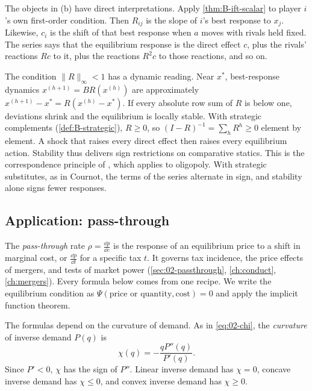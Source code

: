 The objects in (b) have direct interpretations. Apply \cref{thm:B-ift-scalar} to player $i$'s own first-order
condition. Then $R_{ij}$ is the slope of $i$'s best response to $x_j$. Likewise, $c_i$ is the shift of that best
response when $a$ moves with rivals held fixed. The series says that the equilibrium response is the direct effect $c$, plus the
rivals' reactions $Rc$ to it, plus the reactions $R^2c$ to those reactions, and so on.

\begin{remark}\label{rem:B-correspondence}
The condition $\|R\|_\infty < 1$ has a dynamic reading. Near $x^*$, best-response dynamics
$x^{(h + 1)} = BR(x^{(h)})$ are approximately $x^{(h + 1)} - x^* = R(x^{(h)} - x^*)$. If every absolute row sum of $R$ is
below one, deviations shrink and the equilibrium is locally stable. With strategic complements
(\cref{def:B-strategic}), $R \geq 0$, so
$(I - R)^{-1} = \sum_h R^h \geq 0$ element by element. A shock that raises every direct effect then raises every
equilibrium action. Stability thus delivers sign restrictions on comparative statics. This is the correspondence
principle of \citet{Samuelson1947}, which \citet{Dixit1986} applies to oligopoly. With strategic substitutes, as in
Cournot, the terms of the series alternate in sign, and stability alone signs fewer responses.
\end{remark}

\subsection{Application: pass-through}\label{sec:B-passthrough}

The \emph{pass-through} rate $\rho = \frac{\dd p}{\dd c}$ is the response of an equilibrium price to a shift in
marginal cost, or $\frac{\dd p}{\dd t}$ for a specific tax $t$. It governs tax incidence, the price effects of
mergers, and tests of market power (\cref{sec:02-passthrough}, \cref{ch:conduct}, \cref{ch:mergers}). Every formula
below comes from one recipe. We write the equilibrium condition as $\Psi(\text{price or quantity}, \text{cost}) = 0$
and apply the implicit function theorem.

The formulas depend on the curvature of demand. As in \eqref{eq:02-chi}, the \emph{curvature} of inverse demand
$P(q)$ is
\begin{equation}\label{eq:B-chi}
\chi(q) = -\frac{qP''(q)}{P'(q)} .
\end{equation}
Since $P' < 0$, $\chi$ has the sign of $P''$. Linear inverse demand has $\chi = 0$, concave inverse demand has
$\chi \leq 0$, and convex inverse demand has $\chi \geq 0$.

